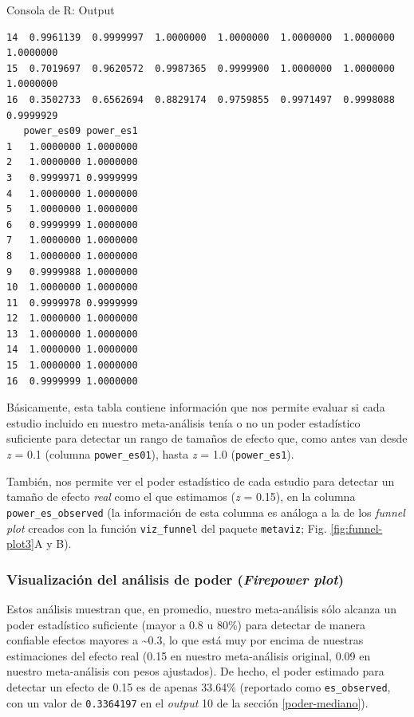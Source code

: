 \documentclass[
  bookmarksnumbered]{article}
\begin{document}
\begin{ROut}{Consola de R: Output~\thetcbcounter}
\begin{footnotesize}
\begin{verbatim}
14  0.9961139  0.9999997  1.0000000  1.0000000  1.0000000  1.0000000  1.0000000
15  0.7019697  0.9620572  0.9987365  0.9999900  1.0000000  1.0000000  1.0000000
16  0.3502733  0.6562694  0.8829174  0.9759855  0.9971497  0.9998088  0.9999929
   power_es09 power_es1
1   1.0000000 1.0000000
2   1.0000000 1.0000000
3   0.9999971 0.9999999
4   1.0000000 1.0000000
5   1.0000000 1.0000000
6   0.9999999 1.0000000
7   1.0000000 1.0000000
8   1.0000000 1.0000000
9   0.9999988 1.0000000
10  1.0000000 1.0000000
11  0.9999978 0.9999999
12  1.0000000 1.0000000
13  1.0000000 1.0000000
14  1.0000000 1.0000000
15  1.0000000 1.0000000
16  0.9999999 1.0000000
 \end{verbatim}
                \end{footnotesize}
                \end{ROut}

Básicamente, esta tabla contiene información que nos permite evaluar si cada estudio incluido en nuestro meta-análisis tenía o no un poder estadístico suficiente para detectar un rango de tamaños de efecto que, como antes van desde \emph{z} = 0.1 (columna \texttt{power\_es01}), hasta \emph{z} = 1.0 (\texttt{power\_es1}).

También, nos permite ver el poder estadístico de cada estudio para detectar un tamaño de efecto \emph{real} como el que estimamos (\emph{z} = 0.15), en la columna \texttt{power\_es\_observed} (la información de esta columna es análoga a la de los \emph{funnel plot} creados con la función \texttt{viz\_funnel} del paquete \texttt{metaviz}; Fig. \ref{fig:funnel-plot3}A y B).

\hypertarget{firepower-plot}{%
\subsubsection{\texorpdfstring{Visualización del análisis de poder (\emph{Firepower plot})}{Visualización del análisis de poder (Firepower plot)}}\label{firepower-plot}}

Estos análisis muestran que, en promedio, nuestro meta-análisis sólo alcanza un poder estadístico suficiente (mayor a 0.8 u 80\%) para detectar de manera confiable efectos mayores a \textasciitilde0.3, lo que está muy por encima de nuestras estimaciones del efecto real (0.15 en nuestro meta-análisis original, 0.09 en nuestro meta-análisis con pesos ajustados). De hecho, el poder estimado para detectar un efecto de 0.15 es de apenas 33.64\% (reportado como \texttt{es\_observed}, con un valor de \texttt{0.3364197} en el \emph{output} 10 de la sección \ref{poder-mediano}).
\end{document}
